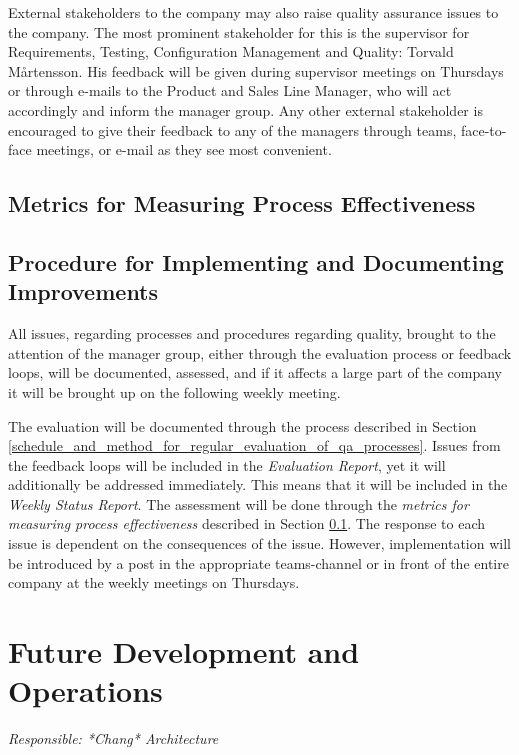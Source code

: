 \documentclass{article}
\begin{document}
External stakeholders to the company may also raise quality assurance issues to the company. The most prominent stakeholder for this is the supervisor for Requirements, Testing, Configuration Management and Quality: Torvald Mårtensson. His feedback will be given during supervisor meetings on Thursdays or through e-mails to the Product and Sales Line Manager, who will act accordingly and inform the manager group. Any other external stakeholder is encouraged to give their feedback to any of the managers through teams, face-to-face meetings, or e-mail as they see most convenient. 

\subsection{Metrics for Measuring Process Effectiveness}
\label{metrics_for_measuring_process_effectiveness}


\subsection{Procedure for Implementing and Documenting Improvements}
All issues, regarding processes and procedures regarding quality, brought to the attention of the manager group, either through the evaluation process or feedback loops, will be documented, assessed, and if it affects a large part of the company it will be brought up on the following weekly meeting. 

The evaluation will be documented through the process described in Section \ref{schedule_and_method_for_regular_evaluation_of_qa_processes}. Issues from the feedback loops will be included in the \textit{Evaluation Report}, yet it will additionally be addressed immediately. This means that it will be included in the \textit{Weekly Status Report}. The assessment will be done through the \textit{metrics for measuring process effectiveness} described in Section \ref{metrics_for_measuring_process_effectiveness}. The response to each issue is dependent on the consequences of the issue. However, implementation will be introduced by a post in the appropriate teams-channel or in front of the entire company at the weekly meetings on Thursdays. 


\newpage
\section{Future Development and Operations}
\textit{Responsible: *Chang* Architecture}
\end{document}

